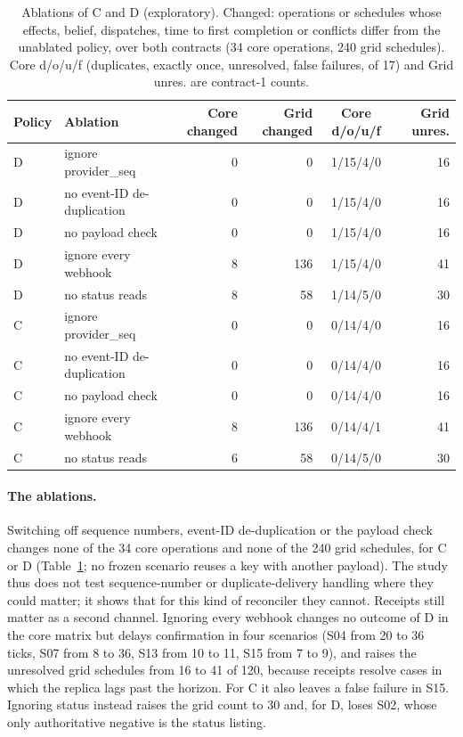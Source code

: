 \documentclass[11pt]{article}
\begin{document}
\begin{table}[!htbp]
\centering
\small
\caption{Ablations of C and D (exploratory). Changed: operations or schedules whose effects, belief, dispatches, time to first completion or conflicts differ from the unablated policy, over both contracts (34 core operations, 240 grid schedules). Core d/o/u/f (duplicates, exactly once, unresolved, false failures, of 17) and Grid unres. are contract-1 counts.}
\label{tab:ablations}
\begin{tabular}{@{}llrrcr@{}}
\toprule
Policy & Ablation & Core changed & Grid changed & Core d/o/u/f & Grid unres. \\
\midrule
D & ignore provider\_seq & 0 & 0 & 1/15/4/0 & 16 \\
D & no event-ID de-duplication & 0 & 0 & 1/15/4/0 & 16 \\
D & no payload check & 0 & 0 & 1/15/4/0 & 16 \\
D & ignore every webhook & 8 & 136 & 1/15/4/0 & 41 \\
D & no status reads & 8 & 58 & 1/14/5/0 & 30 \\
\midrule
C & ignore provider\_seq & 0 & 0 & 0/14/4/0 & 16 \\
C & no event-ID de-duplication & 0 & 0 & 0/14/4/0 & 16 \\
C & no payload check & 0 & 0 & 0/14/4/0 & 16 \\
C & ignore every webhook & 8 & 136 & 0/14/4/1 & 41 \\
C & no status reads & 6 & 58 & 0/14/5/0 & 30 \\
\bottomrule
\end{tabular}
\end{table}

\paragraph{The ablations.} Switching off sequence numbers, event-ID de-duplication or the payload check changes none of the 34 core operations and none of the 240 grid schedules, for C or D (Table~\ref{tab:ablations}; no frozen scenario reuses a key with another payload). The study thus does not test sequence-number or duplicate-delivery handling where they could matter; it shows that for this kind of reconciler they cannot. Receipts still matter as a second channel. Ignoring every webhook changes no outcome of D in the core matrix but delays confirmation in four scenarios (S04 from 20 to 36 ticks, S07 from 8 to 36, S13 from 10 to 11, S15 from 7 to 9), and raises the unresolved grid schedules from 16 to 41 of 120, because receipts resolve cases in which the replica lags past the horizon. For C it also leaves a false failure in S15. Ignoring status instead raises the grid count to 30 and, for D, loses S02, whose only authoritative negative is the status listing.
\end{document}
